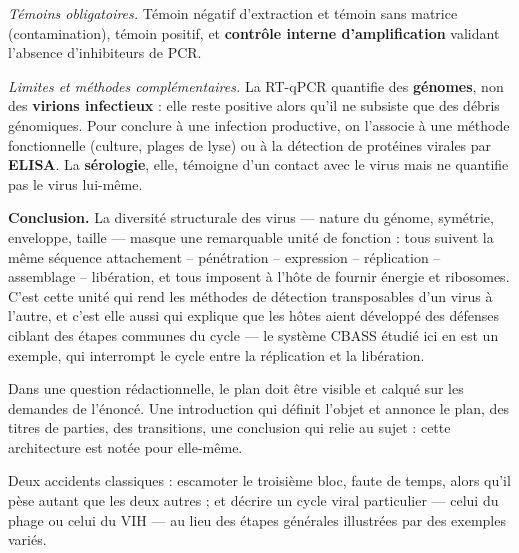 \documentclass[11pt,a4paper]{article}
\begin{document}
\emph{Témoins obligatoires.} Témoin négatif d'extraction et témoin sans matrice (contamination), témoin positif, et \textbf{contrôle interne d'amplification} validant l'absence d'inhibiteurs de PCR.

\emph{Limites et méthodes complémentaires.} La RT-qPCR quantifie des \textbf{génomes}, non des \textbf{virions infectieux} : elle reste positive alors qu'il ne subsiste que des débris génomiques. Pour conclure à une infection productive, on l'associe à une méthode fonctionnelle (culture, plages de lyse) ou à la détection de protéines virales par \textbf{ELISA}. La \textbf{sérologie}, elle, témoigne d'un contact avec le virus mais ne quantifie pas le virus lui-même.

\textbf{Conclusion.} La diversité structurale des virus --- nature du génome, symétrie, enveloppe, taille --- masque une remarquable unité de fonction : tous suivent la même séquence attachement -- pénétration -- expression -- réplication -- assemblage -- libération, et tous imposent à l'hôte de fournir énergie et ribosomes. C'est cette unité qui rend les méthodes de détection transposables d'un virus à l'autre, et c'est elle aussi qui explique que les hôtes aient développé des défenses ciblant des étapes communes du cycle --- le système CBASS étudié ici en est un exemple, qui interrompt le cycle entre la réplication et la libération.

\begin{methode}

Dans une question rédactionnelle, le plan doit être visible et calqué sur les demandes de l'énoncé. Une introduction qui définit l'objet et annonce le plan, des titres de parties, des transitions, une conclusion qui relie au sujet : cette architecture est notée pour elle-même.

\end{methode}

\begin{piege}

Deux accidents classiques : escamoter le troisième bloc, faute de temps, alors qu'il pèse autant que les deux autres ; et décrire un cycle viral particulier --- celui du phage ou celui du VIH --- au lieu des étapes générales illustrées par des exemples variés.

\end{piege}
\end{document}
